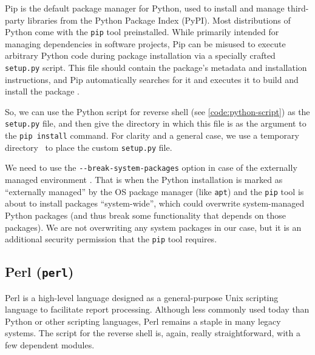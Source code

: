 
Pip is the default package manager for Python, used to install and manage third-party libraries from the Python Package Index (PyPI). Most distributions of Python come with the \texttt{pip} tool preinstalled. While primarily intended for managing dependencies in software projects, Pip can be misused to execute arbitrary Python code during package installation via a specially crafted \texttt{setup.py} script. This file should contain the package's metadata and installation instructions, and Pip automatically searches for it and executes it to build and install the package \cite{pip-install-doc}.

So, we can use the Python script for reverse shell (see \cref{code:python-script}) as the \texttt{setup.py} file, and then give the directory in which this file is as the argument to the \texttt{pip install} command. For clarity and a general case, we use a temporary directory \tmp\ to place the custom \texttt{setup.py} file.


We need to use the \texttt{-{}-break-system-packages} option in case of the externally managed environment \cite{pip-install-doc}. That is when the Python installation is marked as ``externally managed'' by the OS package manager (like \texttt{apt}) and the \texttt{pip} tool is about to install packages ``system-wide'', which could overwrite system-managed Python packages (and thus break some functionality that depends on those packages). We are not overwriting any system packages in our case, but it is an additional security permission that the \texttt{pip} tool requires.


\subsection{Perl (\texttt{perl})}


Perl is a high-level language designed as a general-purpose Unix scripting language to facilitate report processing. Although less commonly used today than Python or other scripting languages, Perl remains a staple in many legacy systems. The script for the reverse shell is, again, really straightforward, with a few dependent modules.

